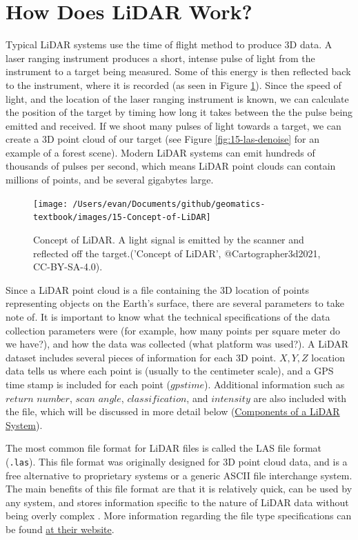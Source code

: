 \documentclass[
]{book}
\begin{document}
\hypertarget{how-does-lidar-work}{%
\section{How Does LiDAR Work?}\label{how-does-lidar-work}}

Typical LiDAR systems use the time of flight method to produce 3D data. A laser ranging instrument produces a short, intense pulse of light from the instrument to a target being measured. Some of this energy is then reflected back to the instrument, where it is recorded (as seen in Figure \ref{fig:15-Concept-of-LiDAR}). Since the speed of light, and the location of the laser ranging instrument is known, we can calculate the position of the target by timing how long it takes between the the pulse being emitted and received. If we shoot many pulses of light towards a target, we can create a 3D point cloud of our target (see Figure \ref{fig:15-las-denoise} for an example of a forest scene). Modern LiDAR systems can emit hundreds of thousands of pulses per second, which means LiDAR point clouds can contain millions of points, and be several gigabytes large.

\begin{figure}
\texttt{[image: /Users/evan/Documents/github/geomatics-textbook/images/15-Concept-of-LiDAR]} \caption{Concept of LiDAR. A light signal is emitted by the scanner and reflected off the target.('Concept of LiDAR', @Cartographer3d2021, CC-BY-SA-4.0).}\label{fig:15-Concept-of-LiDAR}
\end{figure}

Since a LiDAR point cloud is a file containing the 3D location of points representing objects on the Earth's surface, there are several parameters to take note of. It is important to know what the technical specifications of the data collection parameters were (for example, how many points per square meter do we have?), and how the data was collected (what platform was used?). A LiDAR dataset includes several pieces of information for each 3D point. \(X,Y,Z\) location data tells us where each point is (usually to the centimeter scale), and a GPS time stamp is included for each point (\(gpstime\)). Additional information such as \(return\) \(number\), \(scan\) \(angle\), \(classification\), and \(intensity\) are also included with the file, which will be discussed in more detail below (\protect\hyperlink{components-of-a-lidar-system}{Components of a LiDAR System}).

The most common file format for LiDAR files is called the LAS file format (\texttt{.las}). This file format was originally designed for 3D point cloud data, and is a free alternative to proprietary systems or a generic ASCII file interchange system. The main benefits of this file format are that it is relatively quick, can be used by any system, and stores information specific to the nature of LiDAR data without being overly complex \citep{AmericanSocietyforPhotogrammetry&RemoteSensing2019}. More information regarding the file type specifications can be found \href{https://www.asprs.org/divisions-committees/lidar-division/laser-las-file-format-exchange-activities}{at their website}.
\end{document}
